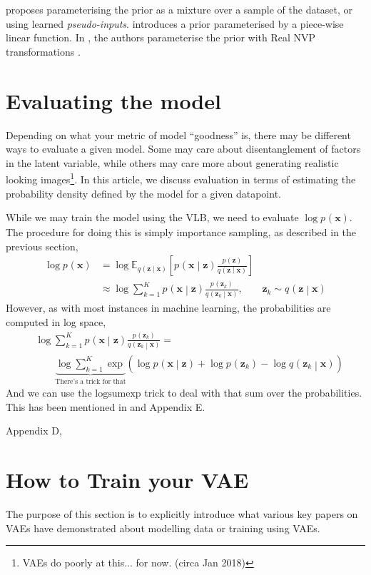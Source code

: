 \documentclass{article}
\newcommand{\prob}[3]{{#1}_{#2} \left( #3 \right)}
\newcommand{\condprob}[4]{{#1}_{#2} \left( #3 \middle| #4 \right)}
\newcommand{\expected}[2]{\mathbb{E}_{#1}\left[ #2 \right]}
\newcommand{\x}{\mathbf{x}}
\newcommand{\z}{\mathbf{z}}
\begin{document}
\cite{tomczak2017vae} proposes parameterising the prior as a mixture over a sample of the dataset, or using learned \emph{pseudo-inputs}. \cite{serban2016multi} introduces a prior parameterised by a piece-wise linear function. In \cite{huang2017led}, the authors parameterise the prior with Real NVP transformations \citep{dinh2016density}.

\section{Evaluating the model}
Depending on what your metric of model ``goodness'' is, there may be different ways to evaluate a given model. Some may care about disentanglement of factors in the latent variable, while others may care more about generating realistic looking images\footnote{VAEs do poorly at this... for now. (circa Jan 2018)}. In this article, we discuss evaluation in terms of estimating the probability density defined by the model for a given datapoint.

While we may train the model using the VLB, we need to evaluate $\log \prob{p}{}{\x}$. The procedure for doing this is simply importance sampling, as described in the previous section,
\begin{align*}
\log \prob{p}{}{\x} &= 
\log \expected{\condprob{q}{}{\z}{\x}}{
\condprob{p}{}{\x}{\z} \frac{\prob{p}{}{\z}}{\condprob{q}{}{\z}{\x}}} \\
&\approx \log \sum_{k=1}^K 
\condprob{p}{}{\x}{\z} \frac{\prob{p}{}{\z_k}}{\condprob{q}{}{\z_k}{\x}}, &\z_k \sim \condprob{q}{}{\z}{\x}
\end{align*}
However, as with most instances in machine learning, the probabilities are computed in log space,
\begin{align*}
&\log \sum_{k=1}^K 
\condprob{p}{}{\x}{\z} \frac{\prob{p}{}{\z_k}}{\condprob{q}{}{\z_k}{\x}} =\\
&\qquad \underbrace{\log \sum_{k=1}^K \exp}_\text{There's a trick for that}\left(
\log \condprob{p}{}{\x}{\z} + \log \prob{p}{}{\z_k} - \log \condprob{q}{}{\z_k}{\x}
\right)
\end{align*}
And we can use the $\mathrm{logsumexp}$ trick to deal with that sum over the probabilities. This has been mentioned in and \cite{rezende2014stochastic} Appendix E.

 \cite{kingma2013auto} Appendix D, 

\section{How to Train your VAE}
The purpose of this section is to explicitly introduce what various key papers on VAEs have demonstrated about modelling data or training using VAEs. 
\end{document}
